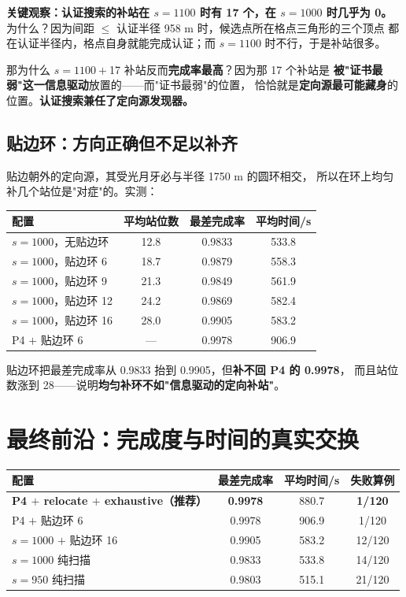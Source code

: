 \textbf{关键观察：认证搜索的补站在 $s=1100$ 时有 17 个，在 $s=1000$ 时几乎为 0。}
为什么？因为间距 $\le$ 认证半径 958 m 时，候选点所在格点三角形的三个顶点
都在认证半径内，格点自身就能完成认证；而 $s=1100$ 时不行，于是补站很多。

那为什么 $s=1100+$17 补站反而\textbf{完成率最高}？因为那 17 个补站是
\textbf{被"证书最弱"这一信息驱动}放置的——而"证书最弱"的位置，
恰恰就是\textbf{定向源最可能藏身}的位置。\textbf{认证搜索兼任了定向源发现器。}

\subsection{贴边环：方向正确但不足以补齐}

贴边朝外的定向源，其受光月牙必与半径 1750 m 的圆环相交，
所以在环上均匀补几个站位是"对症"的。实测：

\begin{center}
\begin{tabular}{lccc}
\toprule
配置 & 平均站位数 & 最差完成率 & 平均时间/s \\ \midrule
$s{=}1000$，无贴边环 & 12.8 & 0.9833 & 533.8 \\
$s{=}1000$，贴边环 6 & 18.7 & 0.9879 & 558.3 \\
$s{=}1000$，贴边环 9 & 21.3 & 0.9849 & 561.9 \\
$s{=}1000$，贴边环 12 & 24.2 & 0.9869 & 582.4 \\
$s{=}1000$，贴边环 16 & 28.0 & 0.9905 & 583.2 \\
P4 $+$ 贴边环 6 & --- & 0.9978 & 906.9 \\
\bottomrule
\end{tabular}
\end{center}

贴边环把最差完成率从 0.9833 抬到 0.9905，但\textbf{补不回 P4 的 0.9978}，
而且站位数涨到 28——说明\textbf{均匀补环不如"信息驱动的定向补站"}。

\section{最终前沿：完成度与时间的真实交换}

\begin{center}
\begin{tabular}{lccc}
\toprule
配置 & 最差完成率 & 平均时间/s & 失败算例 \\ \midrule
\textbf{P4 $+$ relocate $+$ exhaustive（推荐）} & \textbf{0.9978} & 880.7 & \textbf{1/120} \\
P4 $+$ 贴边环 6 & 0.9978 & 906.9 & 1/120 \\
$s{=}1000$ $+$ 贴边环 16 & 0.9905 & 583.2 & 12/120 \\
$s{=}1000$ 纯扫描 & 0.9833 & 533.8 & 14/120 \\
$s{=}950$ 纯扫描 & 0.9803 & 515.1 & 21/120 \\
\bottomrule
\end{tabular}
\end{center}

